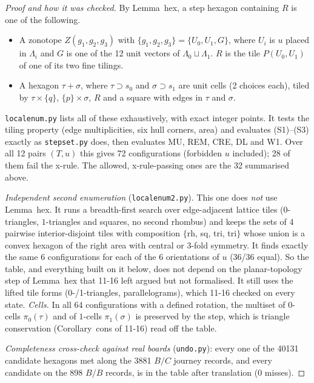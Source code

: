 \documentclass[11pt]{article}
\theoremstyle{definition}\newtheorem{definition}[theorem]{Definition}\newtheorem{remark}[theorem]{Remark}
\begin{document}
\begin{proof}[Proof and how it was checked]
By Lemma~hex, a step hexagon containing $R$ is one of the following.
\begin{itemize}
\item A zonotope $Z(g_1,g_2,g_3)$ with $\{g_1,g_2,g_3\}=\{U_0,U_1,G\}$, where $U_i$ is $u$ placed in $\Lambda_i$ and $G$ is one of the 12 unit vectors of $\Lambda_0\sqcup\Lambda_1$. $R$ is the tile $P(U_0,U_1)$ of one of its two fine tilings.
\item A hexagon $\tau+\sigma$, where $\tau\supset s_0$ and $\sigma\supset s_1$ are unit cells (2 choices each), tiled by $\tau\times\{q\}$, $\{p\}\times\sigma$, $R$ and a square with edges in $\tau$ and $\sigma$.
\end{itemize}
\texttt{localenum.py} lists all of these exhaustively, with exact integer points. It tests the tiling property (edge multiplicities, six hull corners, area) and evaluates (S1)--(S3) exactly as \texttt{stepset.py} does, then evaluates MU, REM, CRE, DL and W1.
Over all 12 pairs $(T,u)$ this gives 72 configurations (forbidden $u$ included); 28 of them fail the x-rule. The allowed, x-rule-passing ones are the 32 summarised above.

\emph{Independent second enumeration} (\texttt{localenum2.py}). This one does \emph{not} use Lemma~hex. It runs a breadth-first search over edge-adjacent lattice tiles ($0$-triangles, $1$-triangles and squares, no second rhombus) and keeps the sets of 4 pairwise interior-disjoint tiles with composition $\{$rh, sq, tri, tri$\}$ whose union is a convex hexagon of the right area with central or $3$-fold symmetry.
It finds exactly the same 6 configurations for each of the 6 orientations of $u$ (36/36 equal).
So the table, and everything built on it below, does not depend on the planar-topology step of Lemma~hex that 11-16 left argued but not formalised. It still uses the lifted tile forms (0-/1-triangles, parallelograms), which 11-16 checked on every state.
\emph{Cells.} In all 64 configurations with a defined rotation, the multiset of $0$-cells $\pi_0(\tau)$ and of $1$-cells $\pi_1(\sigma)$ is preserved by the step, which is triangle conservation (Corollary~cons of 11-16) read off the table.

\emph{Completeness cross-check against real boards} (\texttt{undo.py}): every one of the 40131 candidate hexagons met along the 3881 $B/C$ journey records, and every candidate on the 898 $B/B$ records, is in the table after translation (0 misses).


\end{proof}
\end{document}
